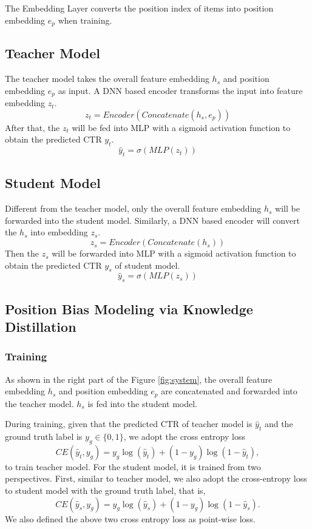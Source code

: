 \documentclass[sigconf,natbib=true,anonymous=false]{acmart}
\begin{document}
The Embedding Layer converts the position index of items into position embedding $e_p$ when training.

\subsection{Teacher Model}
The teacher model takes the overall feature embedding $h_{s}$ and position embedding $e_p$ as input. A DNN based encoder transforms the input into feature embedding $z_t$.
\begin{equation}
    z_t = Encoder(Concatenate(h_s,e_p))
\end{equation}
After that, the $z_t$ will be fed into MLP with a sigmoid activation function to obtain the predicted CTR $y_t$.
\begin{equation}
    \hat{y}_t = \sigma(MLP(z_t))
\end{equation}

\subsection{Student Model}
Different from the teacher model, only the overall feature embedding $h_{s}$ will be forwarded into the student model.
Similarly, a DNN based encoder will convert the $h_s$ into embedding $z_s$.
\begin{equation}
    z_s = Encoder(Concatenate(h_s))
\end{equation}
Then the $z_s$ will be forwarded into MLP with a sigmoid activation function to obtain the predicted CTR $y_s$ of student model.
\begin{equation}
    \hat{y}_s = \sigma(MLP(z_s))
\end{equation}
\subsection{Position Bias Modeling via Knowledge Distillation}
\subsubsection{Training}
As shown in the right part of the Figure \ref{fig:system}, the overall feature embedding $h_{s}$ and position embedding $e_p$ are concatenated and forwarded into the teacher model. $h_{s}$ is fed into the student model.

During training, given that the predicted CTR of teacher model is $\hat{y}_t$ and the ground truth label is $y_g\in\{0, 1\}$, we adopt the cross entropy loss \begin{equation}
    CE(\hat{y}_t, y_g) = y_g \log(\hat{y}_t) + (1 - y_g) \log(1 - \hat{y}_t),
\end{equation}
to train teacher model.
For the student model, it is trained from two perspectives.
First, similar to teacher model, we also adopt the cross-entropy loss to student model with the ground truth label, that is,
\begin{equation}
    CE(\hat{y}_s, y_g) = y_g \log(\hat{y}_s) + (1 - y_g) \log(1 - \hat{y}_s).
\end{equation}
We also defined the above two cross entropy loss as point-wise loss.
\end{document}

